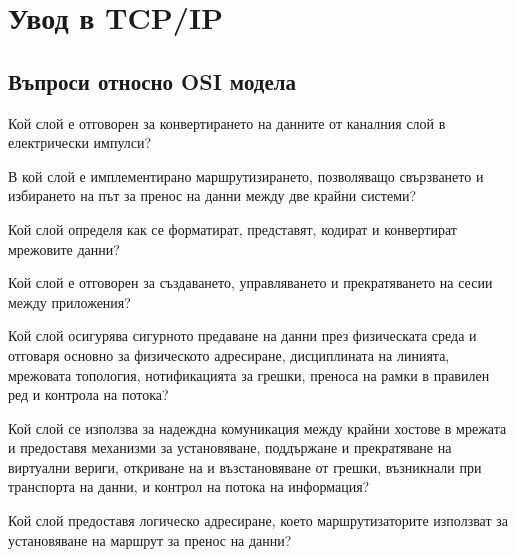 
\section{Увод в TCP/IP}
\subsection{Въпроси относно OSI модела}

\begin{q}
  Кой слой е отговорен за конвертирането на данните от каналния слой в
  електрически импулси?
\end{q}

\begin{q}
  В кой слой е имплементирано маршрутизирането, позволяващо свързването и
  избирането на път за пренос на данни между две крайни системи?
\end{q}

\begin{q}
  Кой слой определя как се форматират, представят, кодират и конвертират
  мрежовите данни?
\end{q}

\begin{q}
  Кой слой е отговорен за създаването, управляването и прекратяването на сесии
  между приложения?
\end{q}

\begin{q}
  Кой слой осигурява сигурното предаване на данни през физическата среда и
  отговаря основно за физическото адресиране, дисциплината на линията, мрежовата
  топология, нотификацията за грешки, преноса на рамки в правилен ред и контрола
  на потока?
\end{q}

\begin{q}
  Кой слой се използва за надеждна комуникация между крайни хостове в мрежата и
  предоставя механизми за установяване, поддържане и прекратяване на виртуални
  вериги, откриване на и възстановяване от грешки, възникнали при транспорта на
  данни, и контрол на потока на информация?
\end{q}

\begin{q}
  Кой слой предоставя логическо адресиране, което маршрутизаторите използват за
  установяване на маршрут за пренос на данни?
\end{q}

